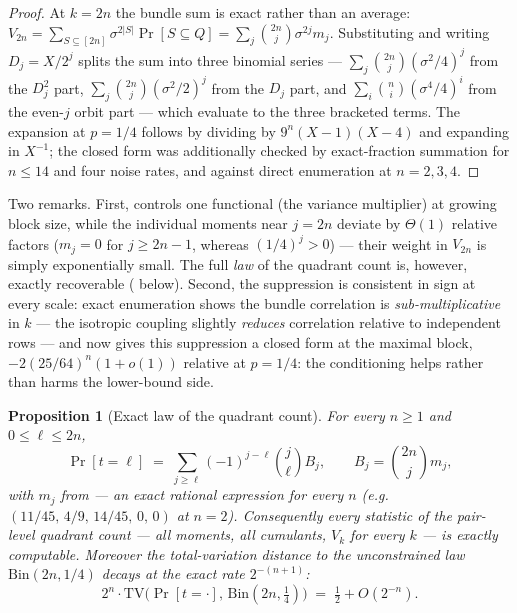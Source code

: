 \documentclass[11pt,a4paper]{article}
\theoremstyle{plain}
\newtheorem{proposition}[theorem]{Proposition}
\theoremstyle{definition}
\begin{document}
\begin{proof}
At $k=2n$ the bundle sum is exact rather than an average: $V_{2n} = \sum_{S \subseteq [2n]} \sigma^{2|S|}\Pr[S \subseteq Q] = \sum_{j}\binom{2n}{j}\sigma^{2j} m_j$. Substituting  and writing $D_j = X/2^j$ splits the sum into three binomial series --- $\sum_j \binom{2n}{j}(\sigma^2/4)^j$ from the $D_j^2$ part, $\sum_j \binom{2n}{j}(\sigma^2/2)^j$ from the $D_j$ part, and $\sum_i \binom{n}{i}(\sigma^4/4)^i$ from the even-$j$ orbit part --- which evaluate to the three bracketed terms. The expansion at $p=1/4$ follows by dividing by $9^n(X-1)(X-4)$ and expanding in $X^{-1}$; the closed form was additionally checked by exact-fraction summation for $n \le 14$ and four noise rates, and against direct enumeration at $n = 2,3,4$.
\end{proof}

Two remarks. First,  controls one functional (the variance multiplier) at growing block size, while the individual moments near $j = 2n$ deviate by $\Theta(1)$ relative factors ($m_j = 0$ for $j \ge 2n-1$, whereas $(1/4)^j > 0$) --- their weight in $V_{2n}$ is simply exponentially small. The full \emph{law} of the quadrant count is, however, exactly recoverable ( below). Second, the suppression is consistent in sign at every scale: exact enumeration shows the bundle correlation is \emph{sub-multiplicative} in $k$ --- the isotropic coupling slightly \emph{reduces} correlation relative to independent rows --- and  now gives this suppression a closed form at the maximal block, $-2(25/64)^n(1+o(1))$ relative at $p=1/4$: the conditioning helps rather than harms the lower-bound side.

\begin{proposition}[Exact law of the quadrant count]
\label{prop:tdist}
For every $n \ge 1$ and $0 \le \ell \le 2n$,
\[
\Pr[t = \ell] \;=\; \sum_{j \ge \ell} (-1)^{j-\ell} \binom{j}{\ell} B_j,
\qquad B_j = \binom{2n}{j} m_j,
\]
with $m_j$ from  --- an exact rational expression for every $n$ (e.g.\ $(11/45,\,4/9,\,14/45,\,0,\,0)$ at $n=2$). Consequently \emph{every} statistic of the pair-level quadrant count --- all moments, all cumulants, $V_k$ for every $k$ --- is exactly computable. Moreover the total-variation distance to the unconstrained law $\mathrm{Bin}(2n,1/4)$ decays at the exact rate $2^{-(n+1)}$:
\[
2^n \cdot \mathrm{TV}\bigl(\Pr[t = \cdot],\, \mathrm{Bin}(2n,\tfrac14)\bigr) \;=\; \tfrac12 + O(2^{-n}).
\]
\end{proposition}
\end{document}
